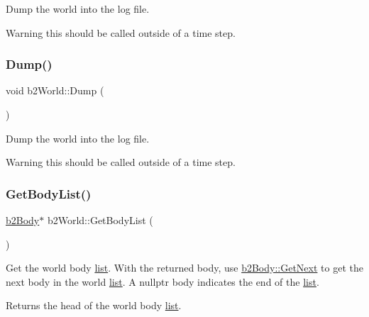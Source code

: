 Dump the world into the log file. \begin{DoxyWarning}{Warning}
this should be called outside of a time step. 
\end{DoxyWarning}
\mbox{\label{classb2World_a73c1fec260d460514edd335d4c235893}} 
\subsubsection{\texorpdfstring{Dump()}{Dump()}\hspace{0.1cm}{\footnotesize\ttfamily [2/2]}}
{\footnotesize\ttfamily void b2\+World\+::\+Dump (\begin{DoxyParamCaption}{ }\end{DoxyParamCaption})}

Dump the world into the log file. \begin{DoxyWarning}{Warning}
this should be called outside of a time step. 
\end{DoxyWarning}
\mbox{\label{classb2World_a0c7f4575a23e2ec044507fa248f431e0}} 
\subsubsection{\texorpdfstring{Get\+Body\+List()}{GetBodyList()}\hspace{0.1cm}{\footnotesize\ttfamily [1/2]}}
{\footnotesize\ttfamily \hyperlink{classb2Body}{b2\+Body}$\ast$ b2\+World\+::\+Get\+Body\+List (\begin{DoxyParamCaption}{ }\end{DoxyParamCaption})}

Get the world body \hyperlink{protocollist-p}{list}. With the returned body, use \hyperlink{classb2Body_ad54182a11d02362b027a0eb072775bdc}{b2\+Body\+::\+Get\+Next} to get the next body in the world \hyperlink{protocollist-p}{list}. A nullptr body indicates the end of the \hyperlink{protocollist-p}{list}. \begin{DoxyReturn}{Returns}
the head of the world body \hyperlink{protocollist-p}{list}. 
\end{DoxyReturn}
\mbox{\label{classb2World_a1b87c03955e3312d308ddf679adf3c85}} 
